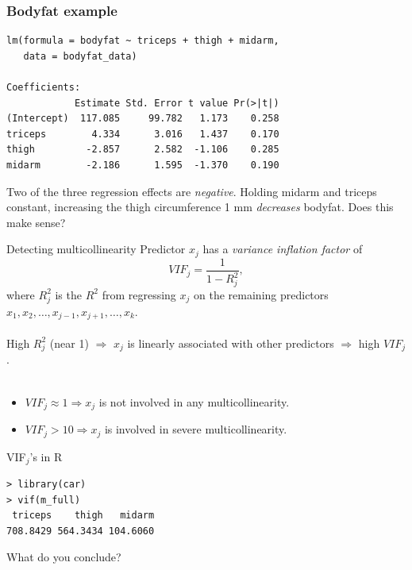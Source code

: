 \documentclass{beamer}
\begin{document}
\begin{frame}[fragile]
\frametitle{Bodyfat example}
\begin{small}
\begin{verbatim}
lm(formula = bodyfat ~ triceps + thigh + midarm, 
   data = bodyfat_data)

Coefficients:
            Estimate Std. Error t value Pr(>|t|)
(Intercept)  117.085     99.782   1.173    0.258
triceps        4.334      3.016   1.437    0.170
thigh         -2.857      2.582  -1.106    0.285
midarm        -2.186      1.595  -1.370    0.190
\end{verbatim}
\end{small}

\pause Two of the three regression effects are {\it negative}. \pause Holding midarm
and triceps constant, increasing the thigh circumference 1 mm
{\it decreases} bodyfat. \pause Does this make sense?
\end{frame}

\begin{frame}{Detecting multicollinearity}
Predictor $x_j$ has a \textit{variance inflation factor} of
$$
VIF_j=\frac{1}{1-R^2_j},
$$
where $R^2_j$ is the $R^2$ from regressing $x_j$ on the remaining predictors $x_1,x_2,\ldots,x_{j-1},x_{j+1},\ldots,x_k$.\\~\\

\pause High $R^2_j$ (near 1) $\Rightarrow$ $x_j$ is linearly associated with other predictors $\Rightarrow$ high $VIF_j$.\\~\\

\begin{itemize}
\item\pause $VIF_j\approx1\Rightarrow x_j$ is not involved in any multicollinearity.
\item\pause $VIF_j>10\Rightarrow x_j$ is involved in severe multicollinearity.
\end{itemize}
\end{frame}

\begin{frame}[fragile]{VIF$_j$'s in {\sc R}}
\begin{verbatim}
> library(car)
> vif(m_full)
 triceps    thigh   midarm 
708.8429 564.3434 104.6060 
\end{verbatim}

What do you conclude?
\end{frame}
\end{document}
